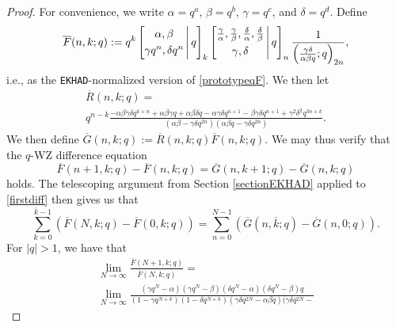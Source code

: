 \documentclass[12pt]{article}
\begin{document}
\begin{proof}
 For convenience, we write $\alpha = q^a$, $\beta = q^b$, $\gamma = q^c$,  and $\delta = q^d$.  Define  $$ \overline{F}(n, k; q) :=  
 q^{k} \left[ \begin{matrix} 
 \alpha, \beta \vspace{1mm} \\ 
 \gamma q^{n}, \delta q^{n} \end{matrix} \, \Bigg| \, q \right]_{k} 
 \left[ \begin{matrix} 
 \frac{\gamma}{\alpha}, \frac{\gamma}{\beta}, \frac{\delta}{\alpha}, \frac{\delta}{\beta} \vspace{1mm} \\ 
 \gamma, \delta \end{matrix} \, \Bigg| \, q \right]_{n} \frac{1}{ \left( \frac{\gamma \delta}{\alpha \beta q}; q \right)_{2n} },  $$  i.e., as the 
 {\tt EKHAD}-normalized version of \eqref{prototypeqF}. We then let 
\begin{multline*}
 \overline{R}(n, k; q) = \\ q^{n-k} \frac{ -\alpha \beta \gamma \delta q^{k+n} + \alpha \beta \gamma 
 q + \alpha \beta \delta q - \alpha \gamma \delta q^{n+1} - \beta \gamma \delta q^{n+1} 
 + \gamma^{2} \delta^{2} q^{3n+k} }{(\alpha \beta - \gamma \delta q^{2n}) (\alpha \beta q - \gamma \delta q^{2n})}. 
\end{multline*}
 We then define 
 $\overline{G}(n, k; q) := \overline{R}(n, k; q) \overline{F}(n, k; q)$. We may thus verify that 
 the $q$-WZ difference equation 
\begin{equation}\label{firstdiff}
 \overline{F}(n+1, k; q) - \overline{F}(n, k; q) = \overline{G}(n, k+1; q) - \overline{G}(n, k; q) 
\end{equation}
 holds. The telescoping argument from Section \ref{sectionEKHAD}
 applied to \eqref{firstdiff} then 
 gives us that 
\begin{equation}\label{kbarN}
 \sum_{k=0}^{\overline{k} - 1} \left( \overline{F}(N,k;q) - \overline{F}(0,k;q) \right) 
 = \sum_{n=0}^{N-1} \left( \overline{G}(n,\overline{k};q) - \overline{G}(n,0;q) \right). 
\end{equation}
 For $|q| > 1$, we have that 
\begin{multline*}
 \lim_{N \to \infty} \frac{ \overline{F}(N+1,k;q) }{\overline{F}(N,k;q)} 
 = \\
 \lim_{N \to \infty} \frac{ (\gamma q^{N} - \alpha) (\gamma q^{N} - \beta) (\delta q^{N} - \alpha) (\delta q^{N} - 
 \beta) 
 q }{ (1 - \gamma q^{N+k}) (1 - \delta q^{N + k}) (\gamma \delta q^{2N} - \alpha \beta q) (\gamma \delta q^{2N} - 
}
\end{multline*}
\end{proof}
\end{document}
